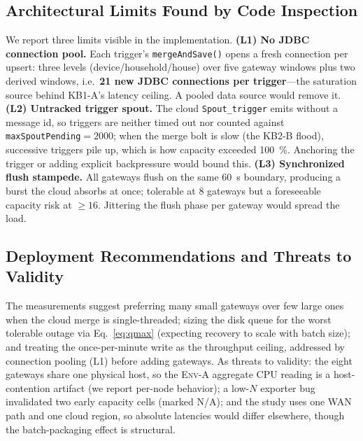 \documentclass[conference]{IEEEtran}
\newcommand{\code}[1]{\texttt{#1}}
\begin{document}
\subsection{Architectural Limits Found by Code Inspection}\label{sec:limits}
We report three limits visible in the implementation.
\textbf{(L1) No JDBC connection pool.} Each trigger's \code{mergeAndSave()} opens
a fresh connection per upsert: three levels (device/household/house) over five
gateway windows plus two derived windows, i.e.\ \textbf{21 new JDBC connections
per trigger}---the saturation source behind KB1-A's latency ceiling. A pooled data
source would remove it.
\textbf{(L2) Untracked trigger spout.} The cloud \code{Spout\_trigger} emits
without a message id, so triggers are neither timed out nor counted against
\code{maxSpoutPending}$=2000$; when the merge bolt is slow (the KB2-B flood),
successive triggers pile up, which is how capacity exceeded \SI{100}{\percent}.
Anchoring the trigger or adding explicit backpressure would bound this.
\textbf{(L3) Synchronized flush stampede.} All gateways flush on the same
\SI{60}{\second} boundary, producing a burst the cloud absorbs at once; tolerable
at 8 gateways but a foreseeable capacity risk at $\geq\!16$. Jittering the flush
phase per gateway would spread the load.

\subsection{Deployment Recommendations and Threats to Validity}
The measurements suggest preferring many small gateways over few large ones when
the cloud merge is single-threaded; sizing the disk queue for the worst tolerable
outage via Eq.~\eqref{eq:qmax} (expecting recovery to scale with batch size); and
treating the once-per-minute write as the throughput ceiling, addressed by
connection pooling (L1) before adding gateways. As threats to validity: the eight
gateways share one physical host, so the \textsc{Env-A} aggregate CPU reading is a
host-contention artifact (we report per-node behavior); a low-$N$ exporter bug
invalidated two early capacity cells (marked N/A); and the study uses one WAN path
and one cloud region, so absolute latencies would differ elsewhere, though the
batch-packaging effect is structural.

\end{document}
